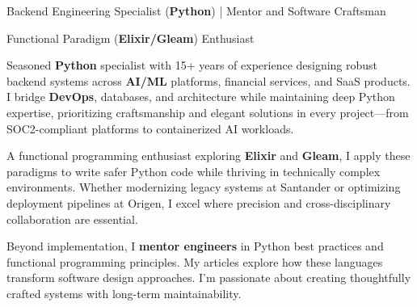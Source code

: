 \documentclass[a4paper,10pt]{article}
\title{\doctitle}
\begin{document}
	\noindent
	\begin{minipage}{\textwidth}
		{\Large{}\selectfont\color{darkblue} Backend Engineering Specialist (\textbf{Python}) | Mentor and Software Craftsman}

		\vspace{0.2cm}
        {\selectfont\color{darkblue} Functional Paradigm (\textbf{Elixir/Gleam}) Enthusiast}
		\vspace{0.3cm}
	\end{minipage}

	\noindent
	\begin{minipage}[t]{0.7\textwidth}
		\vspace{0pt}
		\justifying

		Seasoned \textbf{Python} specialist with 15+ years of experience designing robust backend systems
		across \textbf{AI/ML} platforms, financial services, and SaaS products. I bridge \textbf{DevOps},
		databases, and architecture while maintaining deep Python expertise, prioritizing
		craftsmanship and elegant solutions in every project—from SOC2-compliant platforms to
		containerized AI workloads.
		\vspace{0.55cm}

		A functional programming enthusiast exploring \textbf{Elixir} and \textbf{Gleam}, I apply these paradigms
		to write safer Python code while thriving in technically complex environments. Whether
		modernizing legacy systems at Santander or optimizing deployment pipelines at Origen, I
		excel where precision and cross-disciplinary collaboration are essential.
		\vspace{0.55cm}

		Beyond implementation, I \textbf{mentor engineers} in Python best practices and functional
		programming principles. My articles explore how these
		languages transform software design approaches. I'm passionate about creating
		thoughtfully crafted systems with long-term maintainability.

	\end{minipage}%
	\hfill%
\end{document}
